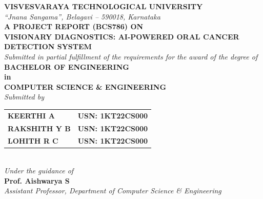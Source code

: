 \documentclass[12pt,a4paper,oneside]{report}
\newcommand{\projecttitle}{Visionary Diagnostics: AI-Powered Oral Cancer Detection System}
\newcommand{\deptname}{Department of Computer Science \& Engineering}
\newcommand{\guidename}{Prof. Aishwarya S}
\begin{document}
\pagestyle{plain}

\begin{titlepage}
\begin{center}

\textbf{\fontsize{14}{17}\selectfont VISVESVARAYA TECHNOLOGICAL UNIVERSITY}\\[0.2cm]
\textit{\fontsize{11}{14}\selectfont ``Jnana Sangama'', Belagavi -- 590018, Karnataka}\\[0.6cm]

\textbf{\fontsize{13}{16}\selectfont A PROJECT REPORT (BCS786) ON}\\[0.4cm]

\textbf{\fontsize{16}{20}\selectfont \MakeUppercase{\projecttitle}}\\[0.6cm]

\textit{\fontsize{11}{14}\selectfont Submitted in partial fulfillment of the requirements for the award of the degree of}\\[0.3cm]

\textbf{\fontsize{13}{16}\selectfont BACHELOR OF ENGINEERING}\\
\textbf{\fontsize{13}{16}\selectfont in}\\
\textbf{\fontsize{13}{16}\selectfont COMPUTER SCIENCE \& ENGINEERING}\\[0.5cm]

\textit{\fontsize{11}{14}\selectfont Submitted by}\\[0.3cm]

\begin{tabular}{l l}
\textbf{KEERTHI A}    & \textbf{USN: 1KT22CS000} \\
\textbf{RAKSHITH Y B} & \textbf{USN: 1KT22CS000} \\
\textbf{LOHITH R C}   & \textbf{USN: 1KT22CS000} \\
\end{tabular}\\[0.5cm]

\textit{\fontsize{11}{14}\selectfont Under the guidance of}\\[0.2cm]
\textbf{\fontsize{13}{16}\selectfont \guidename}\\
\textit{\fontsize{10.5}{13}\selectfont Assistant Professor, \deptname}\\[0.6cm]


\end{center}
\end{titlepage}
\end{document}
